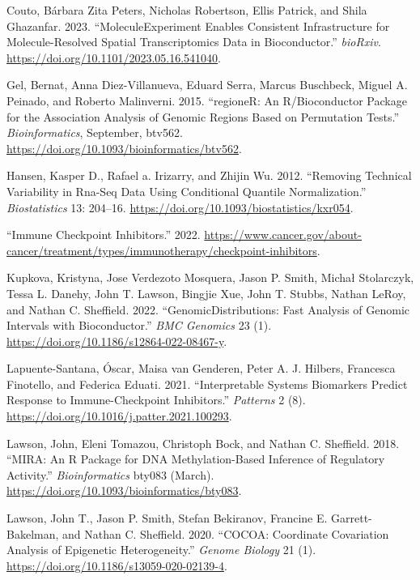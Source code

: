 \begin{cslreferences}
\leavevmode\hypertarget{ref-Couto2023}{}%
Couto, Bárbara Zita Peters, Nicholas Robertson, Ellis Patrick, and Shila Ghazanfar. 2023. ``MoleculeExperiment Enables Consistent Infrastructure for Molecule-Resolved Spatial Transcriptomics Data in Bioconductor.'' \emph{bioRxiv}. \url{https://doi.org/10.1101/2023.05.16.541040}.

\leavevmode\hypertarget{ref-Gel2015}{}%
Gel, Bernat, Anna Diez-Villanueva, Eduard Serra, Marcus Buschbeck, Miguel A. Peinado, and Roberto Malinverni. 2015. ``regioneR: An R/Bioconductor Package for the Association Analysis of Genomic Regions Based on Permutation Tests.'' \emph{Bioinformatics}, September, btv562. \url{https://doi.org/10.1093/bioinformatics/btv562}.

\leavevmode\hypertarget{ref-Hansen2012}{}%
Hansen, Kasper D., Rafael a. Irizarry, and Zhijin Wu. 2012. ``Removing Technical Variability in Rna-Seq Data Using Conditional Quantile Normalization.'' \emph{Biostatistics} 13: 204--16. \url{https://doi.org/10.1093/biostatistics/kxr054}.

\leavevmode\hypertarget{ref-ICBnci}{}%
``Immune Checkpoint Inhibitors.'' 2022. \url{https://www.cancer.gov/about-cancer/treatment/types/immunotherapy/checkpoint-inhibitors}.

\leavevmode\hypertarget{ref-Kupkova2022}{}%
Kupkova, Kristyna, Jose Verdezoto Mosquera, Jason P. Smith, Michał Stolarczyk, Tessa L. Danehy, John T. Lawson, Bingjie Xue, John T. Stubbs, Nathan LeRoy, and Nathan C. Sheffield. 2022. ``GenomicDistributions: Fast Analysis of Genomic Intervals with Bioconductor.'' \emph{BMC Genomics} 23 (1). \url{https://doi.org/10.1186/s12864-022-08467-y}.

\leavevmode\hypertarget{ref-easierPap}{}%
Lapuente-Santana, Óscar, Maisa van Genderen, Peter A. J. Hilbers, Francesca Finotello, and Federica Eduati. 2021. ``Interpretable Systems Biomarkers Predict Response to Immune-Checkpoint Inhibitors.'' \emph{Patterns} 2 (8). \url{https://doi.org/10.1016/j.patter.2021.100293}.

\leavevmode\hypertarget{ref-Lawson2018}{}%
Lawson, John, Eleni Tomazou, Christoph Bock, and Nathan C. Sheffield. 2018. ``MIRA: An R Package for DNA Methylation-Based Inference of Regulatory Activity.'' \emph{Bioinformatics} bty083 (March). \url{https://doi.org/10.1093/bioinformatics/bty083}.

\leavevmode\hypertarget{ref-Lawson2020}{}%
Lawson, John T., Jason P. Smith, Stefan Bekiranov, Francine E. Garrett-Bakelman, and Nathan C. Sheffield. 2020. ``COCOA: Coordinate Covariation Analysis of Epigenetic Heterogeneity.'' \emph{Genome Biology} 21 (1). \url{https://doi.org/10.1186/s13059-020-02139-4}.


\end{cslreferences}
